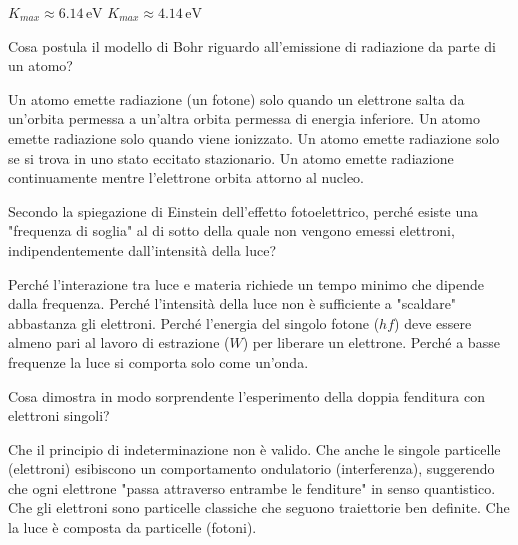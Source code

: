 \documentclass{exam}%
\begin{document}
\begin{questions}
\begin{multicols}{4}
\begin{choices}
\choice $K_{max} \approx 6.14 \, \text{eV}$%
\choice $K_{max} \approx 4.14 \, \text{eV}$%
\end{choices}%
\end{multicols}%
\question Cosa postula il modello di Bohr riguardo all'emissione di radiazione da parte di un atomo?%
\vspace{0.2em}%
\begin{choices}%
\choice Un atomo emette radiazione (un fotone) solo quando un elettrone salta da un'orbita permessa a un'altra orbita permessa di energia inferiore.%
\choice Un atomo emette radiazione solo quando viene ionizzato.%
\choice Un atomo emette radiazione solo se si trova in uno stato eccitato stazionario.%
\choice Un atomo emette radiazione continuamente mentre l'elettrone orbita attorno al nucleo.%
\end{choices}%
\question Secondo la spiegazione di Einstein dell'effetto fotoelettrico, perché esiste una "frequenza di soglia" al di sotto della quale non vengono emessi elettroni, indipendentemente dall'intensità della luce?%
\vspace{0.2em}%
\begin{choices}%
\choice Perché l'interazione tra luce e materia richiede un tempo minimo che dipende dalla frequenza.%
\choice Perché l'intensità della luce non è sufficiente a "scaldare" abbastanza gli elettroni.%
\choice Perché l'energia del singolo fotone ($hf$) deve essere almeno pari al lavoro di estrazione ($W$) per liberare un elettrone.%
\choice Perché a basse frequenze la luce si comporta solo come un'onda.%
\end{choices}%
\question Cosa dimostra in modo sorprendente l'esperimento della doppia fenditura con elettroni singoli?%
\vspace{0.2em}%
\begin{choices}%
\choice Che il principio di indeterminazione non è valido.%
\choice Che anche le singole particelle (elettroni) esibiscono un comportamento ondulatorio (interferenza), suggerendo che ogni elettrone "passa attraverso entrambe le fenditure" in senso quantistico.%
\choice Che gli elettroni sono particelle classiche che seguono traiettorie ben definite.%
\choice Che la luce è composta da particelle (fotoni).%
\end{choices}%
\end{questions}%
\end{document}
